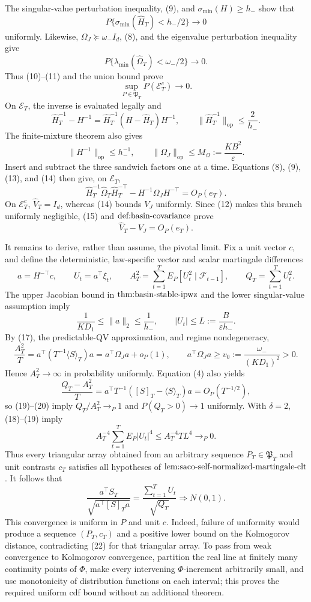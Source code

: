 The singular-value perturbation inequality, (9), and \(\sigma_{\min}(H)\ge h_-\) show that
\[
 P\{\sigma_{\min}(\widehat H_T)<h_-/2\}\longrightarrow0 \tag{10}
\]
uniformly. Likewise, \(\Omega_J\succeq\omega_-I_d\), (8), and the eigenvalue perturbation inequality give
\[
 P\{\lambda_{\min}(\widehat\Omega_T)<\omega_-/2\}\longrightarrow0. \tag{11}
\]
Thus (10)--(11) and the union bound prove
\[
 \sup_{P\in\mathfrak P_T}P(\mathcal E_T^c)\longrightarrow0. \tag{12}
\]
On \(\mathcal E_T\), the inverse is evaluated legally and
\[
 \widehat H_T^{-1}-H^{-1}
 =\widehat H_T^{-1}(H-\widehat H_T)H^{-1},
 \qquad
 \|\widehat H_T^{-1}\|_{\mathrm{op}}\le\frac2{h_-}. \tag{13}
\]
The finite-mixture theorem also gives
\[
 \|H^{-1}\|_{\mathrm{op}}\le h_-^{-1},
 \qquad
 \|\Omega_J\|_{\mathrm{op}}\le M_\Omega:=\frac{KB^2}{\varepsilon}. \tag{14}
\]
Insert and subtract the three sandwich factors one at a time. Equations (8), (9), (13), and (14) then give, on \(\mathcal E_T\),
\[
 \widehat H_T^{-1}\widehat\Omega_T\widehat H_T^{-\top}
 -H^{-1}\Omega_JH^{-\top}=O_P(e_T). \tag{15}
\]
On \(\mathcal E_T^c\), \(\widehat V_T=I_d\), whereas (14) bounds \(V_J\) uniformly. Since (12) makes this branch uniformly negligible, (15) and \(\textnormal{def:basin-covariance}\) prove
\[
 \widehat V_T-V_J=O_P(e_T). \tag{16}
\]

It remains to derive, rather than assume, the pivotal limit. Fix a unit vector \(c\), and define the deterministic, law-specific vector and scalar martingale differences
\[
 a=H^{-\top}c,
 \qquad U_t=a^\top\xi_t,
 \qquad A_T^2=\sum_{t=1}^TE_P[U_t^2\mid\mathcal F_{t-1}],
 \qquad Q_T=\sum_{t=1}^TU_t^2. \tag{17}
\]
The upper Jacobian bound in \(\textnormal{thm:basin-stable-ipwz}\) and the lower singular-value assumption imply
\[
 \frac1{KD_1}\le\|a\|_2\le\frac1{h_-},
 \qquad |U_t|\le L:=\frac{B}{\varepsilon h_-}. \tag{18}
\]
By (17), the predictable-QV approximation, and regime nondegeneracy,
\[
 \frac{A_T^2}{T}
 =a^\top(T^{-1}\langle S\rangle_T)a
 =a^\top\Omega_Ja+o_P(1),
 \qquad
 a^\top\Omega_Ja\ge
 v_0:=\frac{\omega_-}{(KD_1)^2}>0. \tag{19}
\]
Hence \(A_T^2\to\infty\) in probability uniformly. Equation (4) also yields
\[
 \frac{Q_T-A_T^2}{T}
 =a^\top T^{-1}([S]_T-\langle S\rangle_T)a
 =O_P(T^{-1/2}), \tag{20}
\]
so (19)--(20) imply \(Q_T/A_T^2\to_P1\) and \(P(Q_T>0)\to1\) uniformly. With \(\delta=2\), (18)--(19) imply
\[
 A_T^{-4}\sum_{t=1}^TE_P|U_t|^4
 \le A_T^{-4}TL^4\longrightarrow_P0. \tag{21}
\]
Thus every triangular array obtained from an arbitrary sequence \(P_T\in\mathfrak P_T\) and unit contrasts \(c_T\) satisfies all hypotheses of \(\textnormal{lem:saco-self-normalized-martingale-clt}\). It follows that
\[
 \frac{a^\top S_T}{\sqrt{a^\top[S]_Ta}}
 =\frac{\sum_{t=1}^TU_t}{\sqrt{Q_T}}
 \Rightarrow N(0,1). \tag{22}
\]
This convergence is uniform in \(P\) and unit \(c\). Indeed, failure of uniformity would produce a sequence \((P_T,c_T)\) and a positive lower bound on the Kolmogorov distance, contradicting (22) for that triangular array. To pass from weak convergence to Kolmogorov convergence, partition the real line at finitely many continuity points of \(\Phi\), make every intervening \(\Phi\)-increment arbitrarily small, and use monotonicity of distribution functions on each interval; this proves the required uniform cdf bound without an additional theorem.

